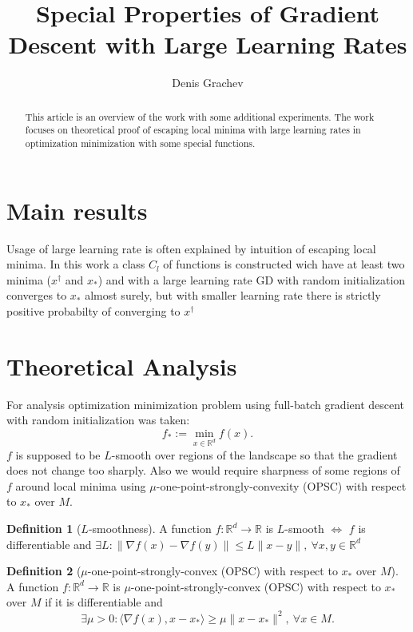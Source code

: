 \documentclass{article}
\title{Special Properties of Gradient Descent with Large Learning Rates}
\author{Denis Grachev}
\theoremstyle{definition}
\newtheorem{definition}{Definition}[section]
\begin{document}
\maketitle

\begin{abstract}
This article is an overview of the work \cite{mohtashami2023special}
with some additional experiments. 
The work focuses on theoretical proof of escaping local minima 
with large learning rates in optimization minimization with 
some special functions. 
\end{abstract}


\section{Main results}
Usage of large learning rate is often explained by intuition of 
escaping local minima. 
In this work a class $C_l$ of functions is constructed 
wich have at least two minima ($x^\dagger$ and $x_\ast$) and 
with a large learning rate GD with random initialization converges 
to $x_\ast$ almost surely, but with smaller learning rate 
there is strictly positive probabilty of converging to $x^\dagger$

\section{Theoretical Analysis}
For analysis optimization minimization problem using full-batch
gradient descent with random initialization was taken:
$$ f_* := \min_{x \in \mathbb{R}^d} f(x).$$
$f$ is supposed to be $L$-smooth over regions of the landscape 
so that the gradient does not change too sharply. 
Also we would require sharpness of some regions of $f$ 
around local minima using 
$\mu$-one-point-strongly-convexity (OPSC) with respect to $x_\ast$ over $M$.
\begin{definition}[$L$-smoothness]
    A function $f: \mathbb{R}^d \rightarrow \mathbb{R}$ 
    is $L$-smooth $\Leftrightarrow$ $f$ is differentiable and 
    $\exists L: \| \nabla f(x) - \nabla f(y)\| \leq L \| x - y \|, \: \forall x, y \in \mathbb{R}^d$ 
\end{definition}
\begin{definition}[$\mu$-one-point-strongly-convex (OPSC) with respect to $x_\ast$ over $M$]
    A function $f: \mathbb{R}^d \rightarrow \mathbb{R}$ is 
    $\mu$-one-point-strongly-convex (OPSC) with respect to $x_\ast$ over $M$ 
    if it is differentiable and 
    $$\exists \mu > 0: \langle \nabla f(x), x - x_\ast \rangle \geq \mu \| x - x_\ast\|^2, \: \forall x \in M.$$
\end{definition}
\end{document}
